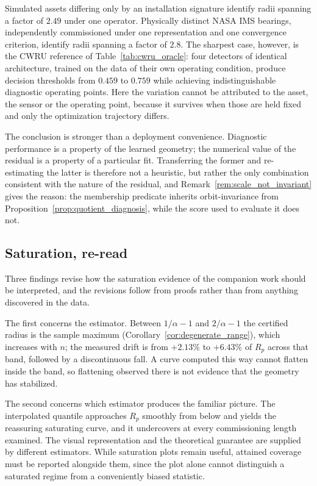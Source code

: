 \documentclass[a4paper]{cas-sc}
\begin{document}
Simulated assets differing only by an installation signature identify radii
spanning a factor of \(2.49\) under one operator. Physically distinct NASA IMS
bearings, independently commissioned under one representation and one
convergence criterion, identify radii spanning a factor of \(2.8\). The
sharpest case, however, is the CWRU reference of
Table~\ref{tab:cwru_oracle}: four detectors of identical architecture, trained
on the data of their own operating condition, produce decision thresholds from
\(0.459\) to \(0.759\) while achieving indistinguishable diagnostic operating
points. Here the variation cannot be attributed to the asset, the sensor or
the operating point, because it survives when those are held fixed and only
the optimization trajectory differs.

The conclusion is stronger than a deployment convenience. Diagnostic
performance is a property of the learned geometry; the numerical value of the
residual is a property of a particular fit. Transferring the former and
re-estimating the latter is therefore not a heuristic, but rather
the only combination consistent with the nature of the residual, and
Remark~\ref{rem:scale_not_invariant} gives the reason: the membership
predicate inherits orbit-invariance from
Proposition~\ref{prop:quotient_diagnosis}, while the score used to evaluate it
does not.

\subsection{Saturation, re-read}
\label{subsec:disc_saturation}

Three findings revise how the saturation evidence of the companion work
\citep{disanti2026inverse} should be interpreted, and the revisions follow
from proofs rather than from anything discovered in the data.

The first concerns the estimator. Between \(1/\alpha-1\) and \(2/\alpha-1\)
the certified radius is the sample maximum
(Corollary~\ref{cor:degenerate_range}), which increases with \(n\); the
measured drift is from \(+2.13\%\) to \(+6.43\%\) of \(R_p\) across that band,
followed by a discontinuous fall. A curve computed this way cannot flatten
inside the band, so flattening observed there is not evidence that the
geometry has stabilized.

The second concerns which estimator produces the familiar picture. The
interpolated quantile approaches \(R_p\) smoothly from below and yields the
reassuring saturating curve, and it undercovers at every commissioning length
examined. The visual representation and the theoretical guarantee are supplied by different estimators.
While saturation plots remain useful, attained coverage must be reported
alongside them, since the plot alone cannot distinguish a
saturated regime from a conveniently biased statistic.
\end{document}
